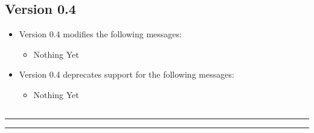 \subsection{Version 0.4}
\label{protocol-0-4}

\begin{itemize}
\item Version 0.4 modifies the following messages:
\begin{itemize}
  \item Nothing Yet
\end{itemize}

\item Version 0.4 deprecates support for the following messages:
\begin{itemize}
  \item Nothing Yet
\end{itemize}
\end{itemize}

\setcounter{tocdepth}{4}
\etocsettocstyle
    {\subsection*{\contentsname}\hrule\medskip
        }
    {\nobreak\medskip\hrule\bigskip}

\localtableofcontents

